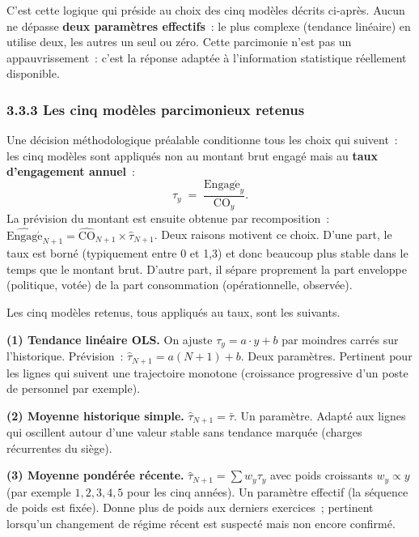 C'est cette logique qui pr\'eside au choix des cinq mod\`eles d\'ecrits
ci-apr\`es. Aucun ne d\'epasse \textbf{deux param\`etres effectifs}~: le plus
complexe (tendance lin\'eaire) en utilise deux, les autres un seul ou
z\'ero. Cette parcimonie n'est pas un appauvrissement~: c'est la r\'eponse
adapt\'ee \`a l'information statistique r\'eellement disponible.

\subsubsection*{3.3.3 \quad Les cinq mod\`eles parcimonieux retenus}

Une d\'ecision m\'ethodologique pr\'ealable conditionne tous les choix qui
suivent~: les cinq mod\`eles sont appliqu\'es non au montant brut engag\'e
mais au \textbf{taux d'engagement annuel}~:
$$
\tau_y \;=\; \frac{\mathrm{Engag\acute{e}}_y}{\mathrm{CO}_y}.
$$
La pr\'evision du montant est ensuite obtenue par recomposition~:
$\widehat{\mathrm{Engag\acute{e}}}_{N+1} = \widehat{\mathrm{CO}}_{N+1} \times \widehat{\tau}_{N+1}$.
Deux raisons motivent ce choix. D'une part, le taux est born\'e (typiquement
entre 0 et 1{,}3) et donc beaucoup plus stable dans le temps que le montant
brut. D'autre part, il s\'epare proprement la part \og enveloppe \fg{}
(politique, vot\'ee) de la part \og consommation \fg{} (op\'erationnelle,
observ\'ee).

Les cinq mod\`eles retenus, tous appliqu\'es au taux, sont les suivants.

\textbf{(1) Tendance lin\'eaire OLS.} On ajuste $\tau_y = a \cdot y + b$ par
moindres carr\'es sur l'historique. Pr\'evision~:
$\widehat{\tau}_{N+1} = a(N+1)+b$. Deux param\`etres. Pertinent pour les
lignes qui suivent une trajectoire monotone (croissance progressive d'un
poste de personnel par exemple).

\textbf{(2) Moyenne historique simple.} $\widehat{\tau}_{N+1} = \bar{\tau}$.
Un param\`etre. Adapt\'e aux lignes qui oscillent autour d'une valeur stable
sans tendance marqu\'ee (charges r\'ecurrentes du si\`ege).

\textbf{(3) Moyenne pond\'er\'ee r\'ecente.}
$\widehat{\tau}_{N+1} = \sum w_y \tau_y$ avec poids croissants
$w_y \propto y$ (par exemple $1, 2, 3, 4, 5$ pour les cinq ann\'ees). Un
param\`etre effectif (la s\'equence de poids est fix\'ee). Donne plus de
poids aux derniers exercices~; pertinent lorsqu'un changement de r\'egime
r\'ecent est suspect\'e mais non encore confirm\'e.

